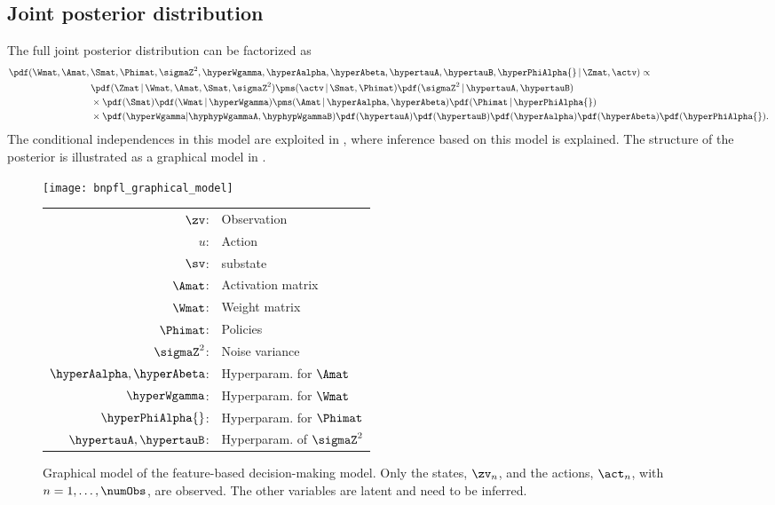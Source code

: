 \documentclass{article}
\begin{document}
\subsection{Joint posterior distribution}
The full joint posterior distribution can be factorized as
\begin{align}
 \begin{split}
  \pdf(\Wmat, \Amat, \, & \Smat, \Phimat, \sigmaZ^2, \hyperWgamma, \hyperAalpha, \hyperAbeta, \hypertauA, \hypertauB,\hyperPhiAlpha{} \,|\, \Zmat, \actv) \propto
 \\ & \pdf(\Zmat\,|\, \Wmat, \Amat, \Smat, \sigmaZ^2) \pms(\actv\,|\,\Smat,\Phimat) \pdf(\sigmaZ^2 \,|\,\hypertauA, \hypertauB)
 \\ & \times \pdf(\Smat) \pdf(\Wmat \,|\, \hyperWgamma) \pms(\Amat \,|\, \hyperAalpha, \hyperAbeta)  \pdf(\Phimat\,|\,\hyperPhiAlpha{})
 \\ & \times \pdf(\hyperWgamma | \hyphypWgammaA, \hyphypWgammaB) \pdf(\hypertauA) \pdf(\hypertauB) \pdf(\hyperAalpha) \pdf(\hyperAbeta) \pdf(\hyperPhiAlpha{}).
 \end{split} \label{eq::model::posterior}
\end{align}
The conditional independences in this model are exploited in , where inference based on this model is explained. 
The structure of the posterior is illustrated as a graphical model in .
\begin{figure}
  \centering
  \begin{minipage}{.5\textwidth}
  \texttt{[image: bnpfl\_graphical\_model]} 
  \end{minipage}
  \begin{minipage}{.35\textwidth}
  \footnotesize
  \begin{tabular}{rl}
   $\zv$: & Observation
   \\ $u$: & Action
   \\ $\sv$: & substate
   \\ $\Amat$: & Activation matrix
   \\ $\Wmat$: & Weight matrix
   \\ $\Phimat$: & Policies
   \\ $\sigmaZ^2$: & Noise variance   
   \\ $\hyperAalpha, \hyperAbeta$: & Hyperparam. for $\Amat$       
   \\ $\hyperWgamma$: & Hyperparam. for $\Wmat$
   \\ $\hyperPhiAlpha{}$: & Hyperparam. for $\Phimat$
   \\ $\hypertauA, \hypertauB$: & Hyperparam. of $\sigmaZ^2$
  \end{tabular}

  \end{minipage}  
  \caption{Graphical model of the feature-based decision-making model. Only the states, $\zv_n$, and the actions, $\act_n$, with $n=1,\ldots,\numObs$, are observed. The other variables are latent and need to be inferred.}
\label{fig::model::gm}
\end{figure}
\end{document}
